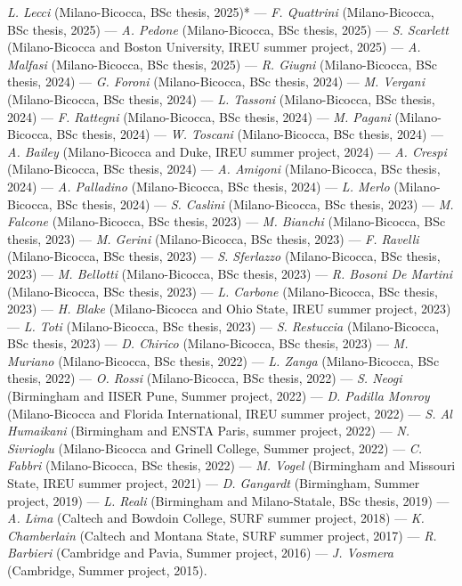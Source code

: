 \textit{L. Lecci} (Milano-Bicocca, BSc thesis, 2025)* --- 
\textit{F. Quattrini} (Milano-Bicocca, BSc thesis, 2025) --- 
\textit{A. Pedone} (Milano-Bicocca, BSc thesis, 2025) --- 
\textit{S. Scarlett} (Milano-Bicocca and Boston University, IREU summer project, 2025) --- 
\textit{A. Malfasi} (Milano-Bicocca, BSc thesis, 2025) --- 
\textit{R. Giugni} (Milano-Bicocca, BSc thesis, 2024) --- 
\textit{G. Foroni} (Milano-Bicocca, BSc thesis, 2024) --- 
\textit{M. Vergani} (Milano-Bicocca, BSc thesis, 2024) --- 
\textit{L. Tassoni} (Milano-Bicocca, BSc thesis, 2024) --- 
\textit{F. Rattegni} (Milano-Bicocca, BSc thesis, 2024) --- 
\textit{M. Pagani} (Milano-Bicocca, BSc thesis, 2024) --- 
\textit{W. Toscani} (Milano-Bicocca, BSc thesis, 2024) --- 
\textit{A. Bailey} (Milano-Bicocca and Duke, IREU summer project, 2024) --- 
\textit{A. Crespi} (Milano-Bicocca, BSc thesis, 2024) --- 
\textit{A. Amigoni} (Milano-Bicocca, BSc thesis, 2024) --- 
\textit{A. Palladino} (Milano-Bicocca, BSc thesis, 2024) --- 
\textit{L. Merlo} (Milano-Bicocca, BSc thesis, 2024) --- 
\textit{S. Caslini} (Milano-Bicocca, BSc thesis, 2023) --- 
\textit{M. Falcone} (Milano-Bicocca, BSc thesis, 2023) --- 
\textit{M. Bianchi} (Milano-Bicocca, BSc thesis, 2023) --- 
\textit{M. Gerini} (Milano-Bicocca, BSc thesis, 2023) --- 
\textit{F. Ravelli} (Milano-Bicocca, BSc thesis, 2023) --- 
\textit{S. Sferlazzo} (Milano-Bicocca, BSc thesis, 2023) --- 
\textit{M. Bellotti} (Milano-Bicocca, BSc thesis, 2023) --- 
\textit{R. Bosoni De Martini} (Milano-Bicocca, BSc thesis, 2023) --- 
\textit{L. Carbone} (Milano-Bicocca, BSc thesis, 2023) --- 
\textit{H. Blake} (Milano-Bicocca and Ohio State, IREU summer project, 2023) --- 
\textit{L. Toti} (Milano-Bicocca, BSc thesis, 2023) --- 
\textit{S. Restuccia} (Milano-Bicocca, BSc thesis, 2023) --- 
\textit{D. Chirico} (Milano-Bicocca, BSc thesis, 2023) --- 
\textit{M. Muriano} (Milano-Bicocca, BSc thesis, 2022) --- 
\textit{L. Zanga} (Milano-Bicocca, BSc thesis, 2022) --- 
\textit{O. Rossi} (Milano-Bicocca, BSc thesis, 2022) --- 
\textit{S. Neogi} (Birmingham and IISER Pune, Summer project, 2022) --- 
\textit{D. Padilla Monroy} (Milano-Bicocca and Florida International, IREU summer project, 2022) --- 
\textit{S. Al Humaikani} (Birmingham and ENSTA Paris, summer project, 2022) --- 
\textit{N. Sivrioglu} (Milano-Bicocca and Grinell College, Summer project, 2022) --- 
\textit{C. Fabbri} (Milano-Bicocca, BSc thesis, 2022) --- 
\textit{M. Vogel} (Birmingham and Missouri State, IREU summer project, 2021) --- 
\textit{D. Gangardt} (Birmingham, Summer project, 2019) --- 
\textit{L. Reali} (Birmingham and Milano-Statale, BSc thesis, 2019) --- 
\textit{A. Lima} (Caltech and Bowdoin College, SURF summer project, 2018) --- 
\textit{K. Chamberlain} (Caltech and Montana State, SURF summer project, 2017) --- 
\textit{R. Barbieri} (Cambridge and Pavia, Summer project, 2016) --- 
\textit{J. Vosmera} (Cambridge, Summer project, 2015).